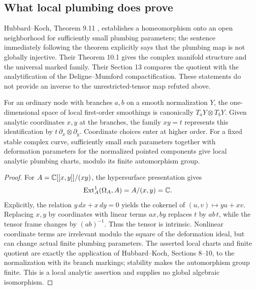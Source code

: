 


\subsection{What local plumbing does prove}
Hubbard--Koch, Theorem 9.11 \cite{AHubbardKoch2014}, establishes a homeomorphism onto an open neighborhood for sufficiently small plumbing parameters; the sentence immediately following the theorem explicitly says that the plumbing map is not globally injective. Their Theorem 10.1 gives the complex manifold structure and the universal marked family. Their Section 13 compares the quotient with the analytification of the Deligne--Mumford compactification. These statements do not provide an inverse to the unrestricted-tensor map refuted above.

\begin{proposition}\label{A1-first-order}
For an ordinary node with branches $a,b$ on a smooth normalization $Y$, the one-dimensional space of local first-order smoothings is canonically $T_aY\otimes T_bY$. Given analytic coordinates $x,y$ at the branches, the family $xy=t$ represents this identification by $t\,\partial_x\otimes\partial_y$. Coordinate choices enter at higher order. For a fixed stable complex curve, sufficiently small such parameters together with deformation parameters for the normalized pointed components give local analytic plumbing charts, modulo its finite automorphism group.
\end{proposition}
\begin{proof}
For $A={\mathbb{C}}[[x,y]]/(xy)$, the hypersurface presentation gives
\[
\operatorname{Ext}^1_A(\Omega_A,A)=A/(x,y)={\mathbb{C}}.
\]
Explicitly, the relation $y\,dx+x\,dy=0$ yields the cokernel of $(u,v)\mapsto yu+xv$. Replacing $x,y$ by coordinates with linear terms $ax,by$ replaces $t$ by $ab\,t$, while the tensor frame changes by $(ab)^{-1}$. Thus the tensor is intrinsic. Nonlinear coordinate terms are irrelevant modulo the square of the deformation ideal, but can change actual finite plumbing parameters. The asserted local charts and finite quotient are exactly the application of Hubbard--Koch, Sections 8--10, to the normalization with its branch markings; stability makes the automorphism group finite. This is a local analytic assertion and supplies no global algebraic isomorphism.
\end{proof}





